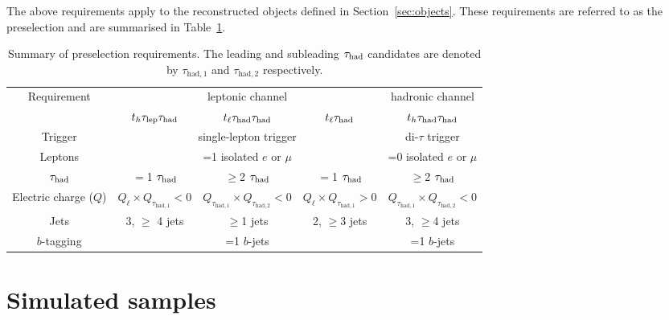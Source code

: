 \documentclass[PAPER, coverpage, atlasdraft=true, texlive=2016, UKenglish]{\ATLASLATEXPATH atlasdoc}
\begin{document}
The above requirements apply to the reconstructed objects defined in Section~\ref{sec:objects}.
These requirements are referred to as the preselection and are summarised in Table~\ref{tab:preselection}. 

\begin{table}[t!]
\caption{\small{Summary of preselection requirements. 
The leading and subleading $\tau_{\mathrm{had}}$ candidates are denoted by $\tau_{\mathrm{had,1}}$ and $\tau_{\mathrm{had,2}}$ respectively.}}
\begin{center}
\begin{tabular}{c|ccc|c}
\toprule\toprule
\multirow{2}{*}{Requirement} &  \multicolumn{3}{c|}{leptonic channel}  & \multicolumn{1}{c}{hadronic channel} \\ 
& $t_h\tau_{\mathrm{lep}} \tau_{\mathrm{had}}$ & $t_{\ell}\tau_{\mathrm{had}} \tau_{\mathrm{had}}$ &  $t_{\ell}\tau_{\mathrm{had}}$ & $t_h\tau_{\mathrm{had}} \tau_{\mathrm{had}}$\\
\midrule
Trigger & \multicolumn{3}{c|}{single-lepton trigger} & di-$\tau$ trigger  \\
Leptons  & \multicolumn{3}{c|}{=1 isolated $e$ or $\mu$}  & =0 isolated $e$ or $\mu$ \\
$\tau_{\mathrm{had}}$  & $=$1 $\tau_{\mathrm{had}}$ & $\geq$2 $\tau_{\mathrm{had}}$ & $=$1 $\tau_{\mathrm{had}}$ & $\geq$2 $\tau_{\mathrm{had}}$ \\
Electric charge ($Q$) & $Q_\ell \times Q_{\tau_{\mathrm{had,1}}} < 0$ & $Q_{\tau_{\mathrm{had,1}}} \times Q_{\tau_{\mathrm{had,2}}} < 0$ & $Q_\ell \times Q_{\tau_{\mathrm{had,1}}} > 0$ & $Q_{\tau_{\mathrm{had,1}}} \times Q_{\tau_{\mathrm{had,2}}} < 0$ \\
Jets  &  3, $\geq$ 4 jets & $\geq$1 jets & 2, $\geq$3 jets & 3, $\geq$4 jets \\
$b$-tagging & \multicolumn{3}{c|}{=1 $b$-jets} & =1 $b$-jets\\
\bottomrule\bottomrule
\end{tabular}
\label{tab:preselection}
\end{center}
\end{table}


%
\section{Simulated samples}
\label{sec:simulations}
\end{document}
